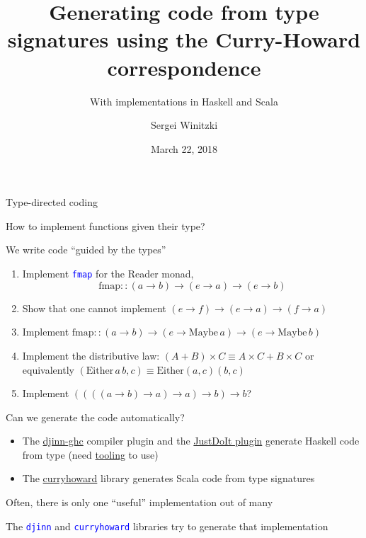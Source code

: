 \documentclass[english]{beamer}
\title[Generating code with Curry-Howard]{Generating code from type signatures
using the Curry-Howard correspondence}
\subtitle{With implementations in Haskell and Scala}
\author{Sergei Winitzki}
\date{March 22, 2018}
\institute[BAHUG]{Bay Area Haskell Users' Group}
\begin{document}
\frame{\titlepage}
\begin{frame}{Type-directed coding}

How to implement functions given their type?

We write code ``guided by the types''
\begin{enumerate}
\item Implement \texttt{\textcolor{blue}{\footnotesize{}fmap}} for the Reader
monad,{\footnotesize{}
\[
\text{fmap}::\left(a\rightarrow b\right)\rightarrow\left(e\rightarrow a\right)\rightarrow\left(e\rightarrow b\right)
\]
}{\footnotesize \par}
\item Show that one cannot implement{\footnotesize{} $\left(e\rightarrow f\right)\rightarrow\left(e\rightarrow a\right)\rightarrow\left(f\rightarrow a\right)$}{\footnotesize \par}
\item Implement {\footnotesize{}$\text{fmap}::\left(a\rightarrow b\right)\rightarrow\left(e\rightarrow\text{Maybe}\,a\right)\rightarrow\left(e\rightarrow\text{Maybe}\,b\right)$}{\footnotesize \par}
\item Implement the distributive law: {\footnotesize{}$\left(A+B\right)\times C\equiv A\times C+B\times C$}
or equivalently {\footnotesize{}$(\text{Either}\,a\,b,c)\equiv\text{Either}\left(a,c\right)\left(b,c\right)$}{\footnotesize \par}
\item Implement $\left(\left(\left(\left(a\rightarrow b\right)\rightarrow a\right)\rightarrow a\right)\rightarrow b\right)\rightarrow b$?
\end{enumerate}
Can we generate the code automatically?
\begin{itemize}
\item The \href{https://hackage.haskell.org/package/djinn-ghc}{djinn-ghc}
compiler plugin and the \href{https://github.com/nomeata/ghc-justdoit}{JustDoIt plugin}
generate Haskell code from type (need \href{https://github.com/serras/emacs-haskell-tutorial/blob/master/tutorial.md\#working-with-holes}{tooling}
to use)
\item The \href{https://github.com/Chymyst/curryhoward}{curryhoward} library
generates Scala code from type signatures
\end{itemize}
Often, there is only one ``useful'' implementation out of many

The \texttt{\textcolor{blue}{\footnotesize{}djinn}} and \texttt{\textcolor{blue}{\footnotesize{}curryhoward}}
libraries try to generate that implementation
\end{frame}
\end{document}
